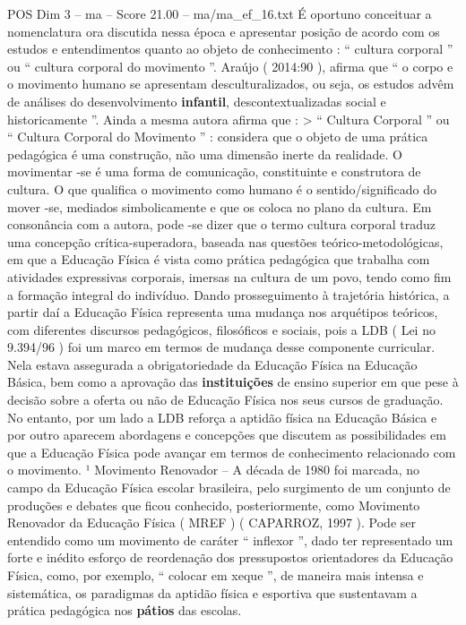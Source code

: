 \begin{textsample}{POS Dim 3 – ma – Score 21.00 – ma/ma\_ef\_16.txt}
É oportuno conceituar a nomenclatura ora discutida nessa época e apresentar posição de acordo com os estudos e entendimentos quanto ao objeto de conhecimento : “ cultura corporal ” ou “ cultura corporal do movimento ”.
Araújo ( 2014:90 ), afirma que “ o corpo e o movimento humano se apresentam desculturalizados, ou seja, os estudos advêm de análises do desenvolvimento \textbf{infantil}, descontextualizadas social e historicamente ”.
Ainda a mesma autora afirma que : > “ Cultura Corporal ” ou “ Cultura Corporal do Movimento ” : considera que o objeto de uma prática pedagógica é uma construção, não uma dimensão inerte da realidade.
O movimentar -se é uma forma de comunicação, constituinte e construtora de cultura.
O que qualifica o movimento como humano é o sentido/significado do mover -se, mediados simbolicamente e que os coloca no plano da cultura.
Em consonância com a autora, pode -se dizer que o termo cultura corporal traduz uma concepção crítica-superadora, baseada nas questões teórico-metodológicas, em que a Educação Física é vista como prática pedagógica que trabalha com atividades expressivas corporais, imersas na cultura de um povo, tendo como fim a formação integral do indivíduo.
Dando prosseguimento à trajetória histórica, a partir daí a Educação Física representa uma mudança nos arquétipos teóricos, com diferentes discursos pedagógicos, filosóficos e sociais, pois a LDB ( Lei no 9.394/96 ) foi um marco em termos de mudança desse componente curricular.
Nela estava assegurada a obrigatoriedade da Educação Física na Educação Básica, bem como a aprovação das \textbf{instituições} de ensino superior em que pese à decisão sobre a oferta ou não de Educação Física nos seus cursos de graduação.
No entanto, por um lado a LDB reforça a aptidão física na Educação Básica e por outro aparecem abordagens e concepções que discutem as possibilidades em que a Educação Física pode avançar em termos de conhecimento relacionado com o movimento. ¹ Movimento Renovador – A década de 1980 foi marcada, no campo da Educação Física escolar brasileira, pelo surgimento de um conjunto de produções e debates que ficou conhecido, posteriormente, como Movimento Renovador da Educação Física ( MREF ) ( CAPARROZ, 1997 ).
Pode ser entendido como um movimento de caráter “ inflexor ”, dado ter representado um forte e inédito esforço de reordenação dos pressupostos orientadores da Educação Física, como, por exemplo, “ colocar em xeque ”, de maneira mais intensa e sistemática, os paradigmas da aptidão física e esportiva que sustentavam a prática pedagógica nos \textbf{pátios} das escolas.

\end{textsample}
